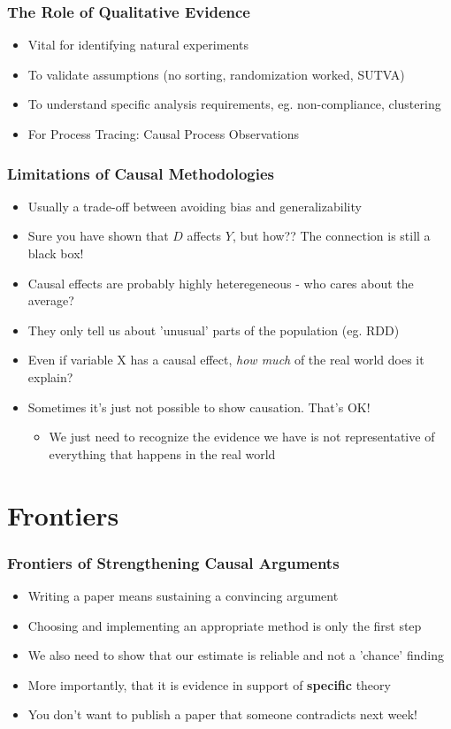 \documentclass[xcolor=x11names,compress]{beamer}\usepackage[]{graphicx}\usepackage[]{color}
\renewcommand{\(}{\begin{columns}}
\renewcommand{\)}{\end{columns}}
\newcommand{\<}[1]{\begin{column}{#1}}
\renewcommand{\>}{\end{column}}
\begin{document}
\begin{frame}
\frametitle{The Role of Qualitative Evidence}
\begin{itemize}
\item Vital for identifying natural experiments
\pause
\item To validate assumptions (no sorting, randomization worked, SUTVA)
\pause
\item To understand specific analysis requirements, eg. non-compliance, clustering
\pause
\item For Process Tracing: Causal Process Observations
\end{itemize}
\end{frame}

\begin{frame}
\frametitle{Limitations of Causal Methodologies}
\begin{itemize}
\item Usually a trade-off between avoiding bias and generalizability
\pause
\item Sure you have shown that $D$ affects $Y$, but how?? The connection is still a black box!
\pause
\item Causal effects are probably highly heteregeneous - who cares about the average?
\pause
\item They only tell us about 'unusual' parts of the population (eg. RDD)
\pause
\item Even if variable X has a causal effect, \textit{how much} of the real world does it explain?
\pause
\item Sometimes it's just not possible to show causation. That's OK!
\begin{itemize}
\item We just need to recognize the evidence we have is not representative of everything that happens in the real world
\end{itemize}
\end{itemize}
\end{frame}

\section{Frontiers}

\begin{frame}
\frametitle{Frontiers of Strengthening Causal Arguments}
\begin{itemize}
\item Writing a paper means sustaining a convincing argument
\pause
\item Choosing and implementing an appropriate method is only the first step
\pause
\item We also need to show that our estimate is reliable and not a 'chance' finding
\pause
\item More importantly, that it is evidence in support of \textbf{specific} theory
\pause
\item You don't want to publish a paper that someone contradicts next week!
\end{itemize}
\end{frame}
\end{document}
